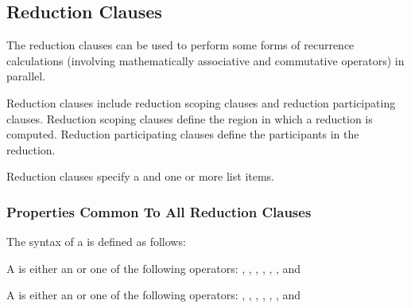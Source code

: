 









\subsection{Reduction Clauses}
\label{subsec:Reduction Clauses}
The reduction clauses can be used to perform some forms of recurrence
calculations (involving mathematically associative and commutative operators)
in parallel.

Reduction clauses include reduction scoping clauses and reduction participating
clauses. Reduction scoping clauses define the region in which a reduction is
computed. Reduction participating clauses define the participants in the
reduction.

Reduction clauses specify a  and one or more list
items.










\subsubsection{Properties Common To All Reduction Clauses}
\label{subsubsec:Properties Common To All Reduction Clauses}

\syntax
The syntax of a  is defined as follows:
\begin{cspecific} %
A  is either an  or one of the following operators:
\code{+},
\code{-},
\code{*},
\code{&},
\code{|},
\code{^},
\code{&&} and
\code{||}
\end{cspecific} %

\begin{cppspecific} %
A  is either an  or one of the following operators:
\code{+},
\code{-},
\code{*},
\code{&},
\code{|},
\code{^},
\code{&&} and
\code{||}
\end{cppspecific} %

